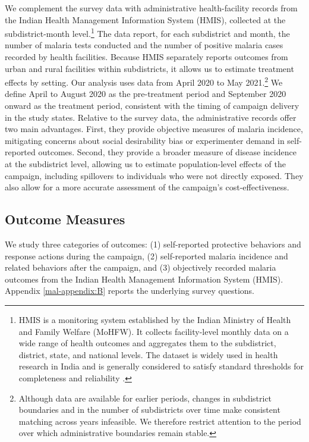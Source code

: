 We complement the survey data with administrative health-facility records from the Indian Health Management Information System (HMIS), collected at the subdistrict-month level.\footnote{HMIS is a monitoring system established by the Indian Ministry of Health and Family Welfare (MoHFW). It collects facility-level monthly data on a wide range of health outcomes and aggregates them to the subdistrict, district, state, and national levels. The dataset is widely used in health research in India and is generally considered to satisfy standard thresholds for completeness and reliability \citep{sharma2016quality}.} The data report, for each subdistrict and month, the number of malaria tests conducted and the number of positive malaria cases recorded by health facilities. Because HMIS separately reports outcomes from urban and rural facilities within subdistricts, it allows us to estimate treatment effects by setting. Our analysis uses data from April 2020 to May 2021.\footnote{Although data are available for earlier periods, changes in subdistrict boundaries and in the number of subdistricts over time make consistent matching across years infeasible. We therefore restrict attention to the period over which administrative boundaries remain stable.} We define April to August 2020 as the pre-treatment period and September 2020 onward as the treatment period, consistent with the timing of campaign delivery in the study states. Relative to the survey data, the administrative records offer two main advantages. First, they provide objective measures of malaria incidence, mitigating concerns about social desirability bias or experimenter demand in self-reported outcomes. Second, they provide a broader measure of disease incidence at the subdistrict level, allowing us to estimate population-level effects of the campaign, including spillovers to individuals who were not directly exposed. They also allow for a more accurate assessment of the campaign’s cost-effectiveness.





\subsection{Outcome Measures}

We study three categories of outcomes: (1) self-reported protective behaviors and response actions during the campaign, (2) self-reported malaria incidence and related behaviors after the campaign, and (3) objectively recorded malaria outcomes from the Indian Health Management Information System (HMIS). Appendix \ref{mal-appendix:B} reports the underlying survey questions. 

